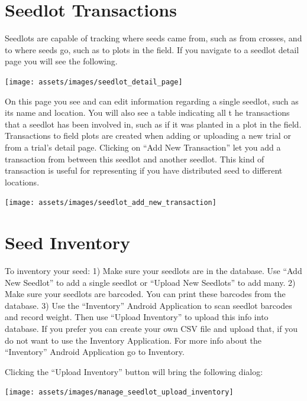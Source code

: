 \documentclass[
  12pt,
]{book}
\begin{document}
\hypertarget{seedlot-transactions}{%
\section{Seedlot Transactions}\label{seedlot-transactions}}

Seedlots are capable of tracking where seeds came from, such as from crosses, and to where seeds go, such as to plots in the field. If you navigate to a seedlot detail page you will see the following.

\begin{center}\texttt{[image: assets/images/seedlot\_detail\_page]} \end{center}

On this page you see and can edit information regarding a single seedlot, such as its name and location. You will also see a table indicating all t he transactions that a seedlot has been involved in, such as if it was planted in a plot in the field. Transactions to field plots are created when adding or uploading a new trial or from a trial's detail page. Clicking on ``Add New Transaction'' let you add a transaction from between this seedlot and another seedlot. This kind of transaction is useful for representing if you have distributed seed to different locations.

\begin{center}\texttt{[image: assets/images/seedlot\_add\_new\_transaction]} \end{center}

\hypertarget{seed-inventory}{%
\section{Seed Inventory}\label{seed-inventory}}

To inventory your seed: 1) Make sure your seedlots are in the database. Use ``Add New Seedlot'' to add a single seedlot or ``Upload New Seedlots'' to add many. 2) Make sure your seedlots are barcoded. You can print these barcodes from the database. 3) Use the ``Inventory'' Android Application to scan seedlot barcodes and record weight. Then use ``Upload Inventory'' to upload this info into database. If you prefer you can create your own CSV file and upload that, if you do not want to use the Inventory Application. For more info about the ``Inventory'' Android Application go to Inventory.

Clicking the ``Upload Inventory'' button will bring the following dialog:

\begin{center}\texttt{[image: assets/images/manage\_seedlot\_upload\_inventory]} \end{center}
\end{document}
